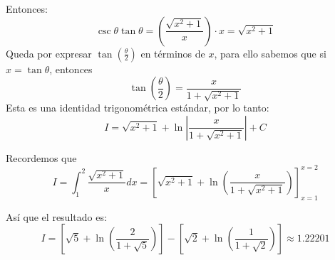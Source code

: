 \documentclass{article}
\theoremstyle{nonumberplain}
\begin{document}
Entonces:
\[
\csc\theta \tan\theta = \left(\frac{\sqrt{x^2+1}}{x}\right) \cdot x = \sqrt{x^2+1}
\]
Queda por expresar \(\tan\left( \frac{\theta}{2} \right)\) en términos de \(x\), para ello sabemos que si \(x = \tan\theta\), entonces
\[
\tan\left(\frac{\theta}{2}\right) = \frac{x}{1 + \sqrt{x^2+1}}
\]
Esta es una identidad trigonométrica estándar, por lo tanto:
\[
I = \sqrt{x^2+1} + \ln \left| \frac{x}{1+\sqrt{x^2+1}} \right| + C
\]

Recordemos que
\[
I = \int_{1}^{2} \frac{\sqrt{x^2+1}}{x} dx = \left[ \sqrt{x^2+1} + \ln \left( \frac{x}{1+\sqrt{x^2+1}} \right) \right]_{x=1}^{x=2}
\]

Así que el resultado es:
\[
I = \left[ \sqrt{5} + \ln \left( \frac{2}{1+\sqrt{5}} \right) \right] - \left[ \sqrt{2} + \ln \left( \frac{1}{1+\sqrt{2}} \right) \right] \approx 1.22201
\]
\end{document}
